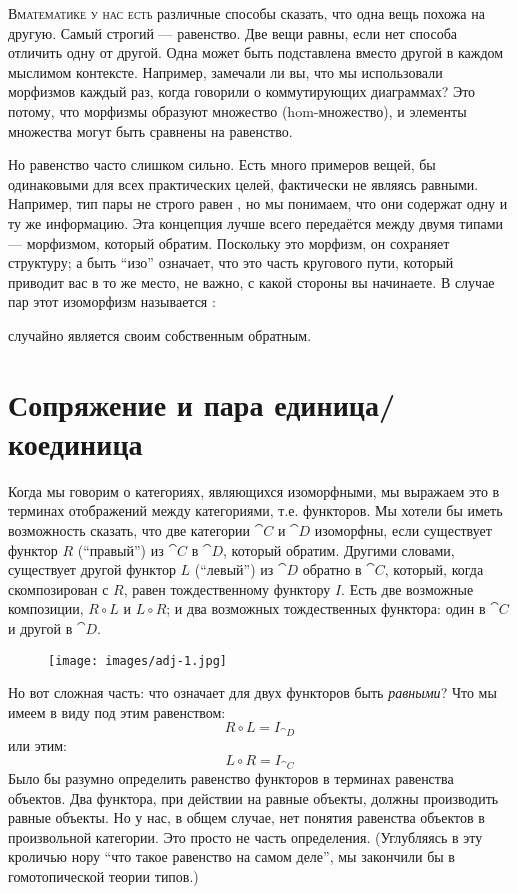 
\lettrine[lhang=0.17]{В}{математике у нас есть} различные способы сказать, что одна вещь похожа на
другую. Самый строгий --- равенство. Две вещи равны, если нет
способа отличить одну от другой. Одна может быть подставлена вместо
другой в каждом мыслимом контексте. Например, замечали ли вы, что мы
использовали  морфизмов каждый раз, когда говорили о коммутирующих
диаграммах? Это потому, что морфизмы образуют множество (hom-множество), и элементы множества
могут быть сравнены на равенство.

Но равенство часто слишком сильно. Есть много примеров вещей,
бы одинаковыми для всех практических целей, фактически не являясь
равными. Например, тип пары  не
строго равен , но мы понимаем, что они
содержат одну и ту же информацию. Эта концепция лучше всего передаётся
 между двумя типами --- морфизмом, который обратим.
Поскольку это морфизм, он сохраняет структуру; а быть ``изо''
означает, что это часть кругового пути, который приводит вас в то же место, не
важно, с какой стороны вы начинаете. В случае пар этот изоморфизм
называется :

 случайно является своим собственным обратным.

\section{Сопряжение и пара единица/коединица}

Когда мы говорим о категориях, являющихся изоморфными, мы выражаем это в терминах
отображений между категориями, т.е. функторов. Мы хотели бы иметь возможность
сказать, что две категории $\cat{C}$ и $\cat{D}$ изоморфны, если
существует функтор $R$ (``правый'') из $\cat{C}$ в $\cat{D}$,
который обратим. Другими словами, существует другой функтор
$L$ (``левый'') из $\cat{D}$ обратно в $\cat{C}$, который, когда
скомпозирован с $R$, равен тождественному функтору $I$.
Есть две возможные композиции, $R \circ L$ и
$L \circ R$; и два возможных тождественных функтора: один в $\cat{C}$
и другой в $\cat{D}$.

\begin{figure}[H]
  \centering
  \texttt{[image: images/adj-1.jpg]}
\end{figure}

\noindent
Но вот сложная часть: что означает для двух функторов быть
\emph{равными}? Что мы имеем в виду под этим равенством:
\[R \circ L = I_{\cat{D}}\]
или этим:
\[L \circ R = I_{\cat{C}}\]
Было бы разумно определить равенство функторов в терминах равенства
объектов. Два функтора, при действии на равные объекты, должны производить
равные объекты. Но у нас, в общем случае, нет понятия равенства объектов
в произвольной категории. Это просто не часть определения.
(Углубляясь в эту кроличью нору ``что такое равенство на самом деле'', мы
закончили бы в гомотопической теории типов.)

